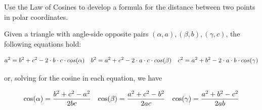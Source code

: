 \begin{problem}[98.]
    Use the Law of Cosines to develop a formula for the distance between two points in polar coordinates.
\end{problem}

\begin{problem}
    Given a triangle with angle-side opposite pairs $(\alpha, a), (\beta, b), (\gamma, c)$, the following equations hold:
    
    \begin{align}
        \notag a^2 = b^2 + c^2 - 2 \cdot b \cdot c \cdot cos(\alpha) && b^2 = a^2 + c^2 - 2 \cdot a \cdot c \cdot cos(\beta) && c^2 = a^2 + b^2 - 2 \cdot a \cdot b \cdot cos(\gamma)
    \end{align}
    
    or, solving for the cosine in each equation, we have
    
    \begin{align}
        \notag \cos(\alpha) = \frac{b^2 + c^2 - a^2}{2bc} && \cos(\beta) = \frac{a^2 + c^2 - b^2}{2ac} && \cos(\gamma) = \frac{a^2 + b^2 - c^2}{2ab}
    \end{align}
\end{problem}

